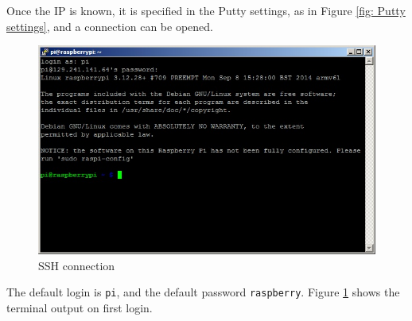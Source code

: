 \documentclass[a4paper,english]{report}
\begin{document}
Once the IP is known, it is specified in the Putty settings, as in Figure \ref{fig: Putty settings}, and a connection can be opened. 
\begin{figure}[htb!]
	\centering \includegraphics[scale=0.45]{fig/Rpi_remote_access2} \caption{SSH connection}
	\label{fig: SSH connection} 
\end{figure}
The default login is \texttt{pi}, and the default password \texttt{raspberry}. Figure \ref{fig: SSH connection} shows the terminal output on first login.
\end{document}

